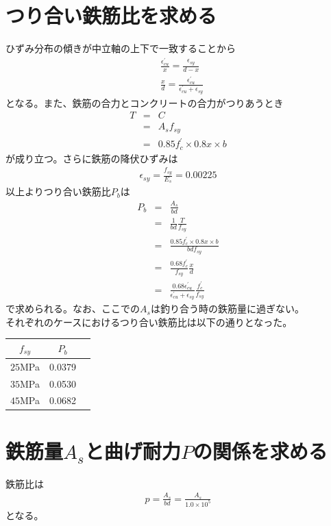 \documentclass[pdflatex,ja=standard,fleqn]{bxjsarticle}
\begin{document}
\section{つり合い鉄筋比を求める}
ひずみ分布の傾きが中立軸の上下で一致することから
\begin{align*}
    &\frac{\epsilon^{\prime}_{cu}}{x}=\frac{\epsilon_{sy}}{d-x}\\
    &\frac{x}{d}=\frac{\epsilon^{\prime}_{cu}}{\epsilon^{\prime}_{cu}+\epsilon_{sy}}
\end{align*}
となる。また、鉄筋の合力とコンクリートの合力がつりあうとき
\begin{eqnarray*}
    T&=&C\\
    &=&A_{s}f_{sy}\\
    &=&0.85f^{\prime}_{c}\times 0.8x\times b
\end{eqnarray*}
が成り立つ。さらに鉄筋の降伏ひずみは
\begin{eqnarray*}
    \epsilon_{sy}=\frac{f_{sy}}{E_{s}}=0.00225
\end{eqnarray*}
以上よりつり合い鉄筋比$P_{b}$は
\begin{eqnarray*}
    P_{b}&=&\frac{A_{s}}{bd}\\
    &=&\frac{1}{bd}\frac{T}{f_{sy}}\\
    &=&\frac{0.85f^{\prime}_{c}\times 0.8x\times b}{bdf_{sy}}\\
    &=&\frac{0.68f^{\prime}_{c}}{f_{sy}}\frac{x}{d}\\
    &=&\frac{0.68\epsilon^{\prime}_{cu}}{\epsilon^{\prime}_{cu}+\epsilon_{sy}}\frac{f^{\prime}_{c}}{f_{sy}}
\end{eqnarray*}
で求められる。なお、ここでの$A_{s}$は釣り合う時の鉄筋量に過ぎない。\\
それぞれのケースにおけるつり合い鉄筋比は以下の通りとなった。
\begin{table}[htbp]
    \begin{tabular}{ccc}
        $f_{sy}$ & $P_{b}$ \\\hline
        $25$MPa & 0.0379 & \\
        $35$MPa & 0.0530 & \\
        $45$MPa & 0.0682 &
    \end{tabular}
\end{table}
\section{鉄筋量$A_{s}$と曲げ耐力$P$の関係を求める}
鉄筋比は
\begin{eqnarray*}
    p=\frac{A_{s}}{bd}=\frac{A_{s}}{1.0\times 10^5}
\end{eqnarray*}
となる。
\end{document}
